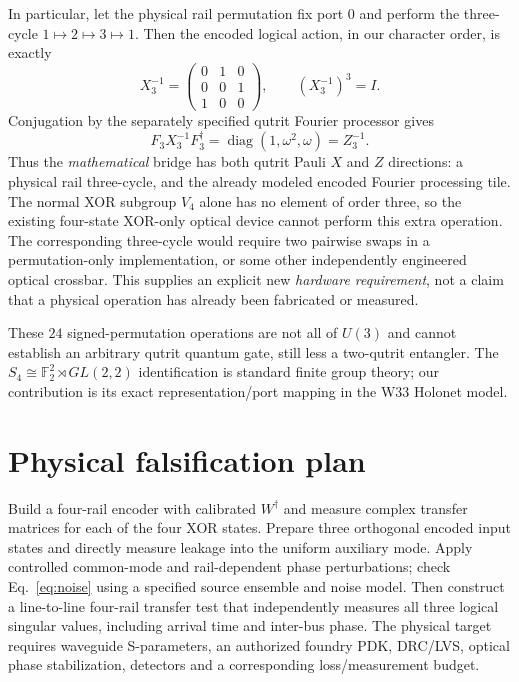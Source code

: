 \documentclass[10pt]{article}
\begin{document}
In particular, let the physical rail permutation
fix port 0 and perform the three-cycle
$1\mapsto2\mapsto3\mapsto1$. Then the encoded logical
action, in our character order, is exactly
\[
 X^{-1}_3=
 \begin{pmatrix}0&1&0\\0&0&1\\1&0&0\end{pmatrix},
 \qquad (X^{-1}_3)^3=I.
\]
Conjugation by the separately specified qutrit Fourier
processor gives
\[
 F_3X^{-1}_3F_3^\dagger
 =\operatorname{diag}(1,\omega^2,\omega)=Z_3^{-1}.
\]
Thus the \emph{mathematical} bridge has both qutrit
Pauli $X$ and $Z$ directions: a physical rail three-cycle,
and the already modeled encoded Fourier processing tile.
The normal XOR subgroup $V_4$ alone has no element
of order three, so the existing four-state XOR-only
optical device cannot perform this extra operation.
The corresponding three-cycle would require two
pairwise swaps in a permutation-only implementation,
or some other independently engineered optical
crossbar. This supplies an explicit new \emph{hardware
requirement}, not a claim that a physical operation
has already been fabricated or measured.

These $24$ signed-permutation operations are not all
of $U(3)$ and cannot establish an arbitrary qutrit
quantum gate, still less a two-qutrit entangler.
The $S_4\cong\mathbb F_2^2\rtimes GL(2,2)$ identification
is standard finite group theory; our contribution is
its exact representation/port mapping in the W33
Holonet model.

\section{Physical falsification plan}
Build a four-rail encoder with calibrated $W^\dagger$
and measure complex transfer matrices for each of the
four XOR states. Prepare three orthogonal encoded
input states and directly measure leakage into the
uniform auxiliary mode. Apply controlled common-mode
and rail-dependent phase perturbations; check
Eq.~\eqref{eq:noise} using a specified source ensemble
and noise model. Then construct a line-to-line
four-rail transfer test that independently measures
all three logical singular values, including arrival
time and inter-bus phase. The physical target requires
waveguide S-parameters, an authorized foundry PDK,
DRC/LVS, optical phase stabilization, detectors and
a corresponding loss/measurement budget.
\end{document}
